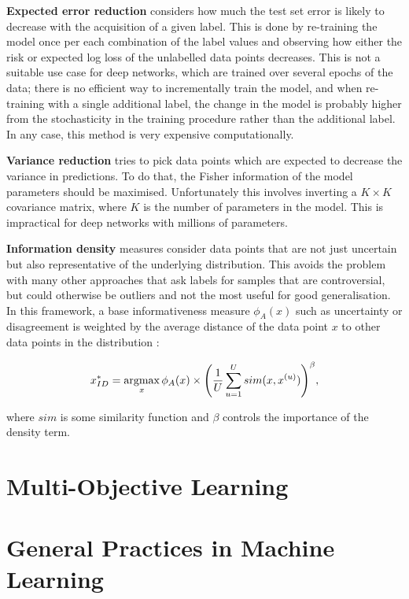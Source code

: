 \textbf{Expected error reduction} considers how much the test set error is likely to decrease with the acquisition of a given label.
This is done by re-training the model once per each combination of the label values and observing how either the risk or expected log loss of the unlabelled data points decreases.
This is not a suitable use case for deep networks, which are trained over several epochs of the data; there is no efficient way to incrementally train the model, and when re-training with a single additional label, the change in the model is probably higher from the stochasticity in the training procedure rather than the additional label.
In any case, this method is very expensive computationally.

\textbf{Variance reduction} tries to pick data points which are expected to decrease the variance in predictions.
To do that, the Fisher information of the model parameters should be maximised.
Unfortunately this involves inverting a $K \times K$ covariance matrix, where $K$ is the number of parameters in the model.
This is impractical for deep networks with millions of parameters.

\textbf{Information density} measures consider data points that are not just uncertain but also representative of the underlying distribution.
This avoids the problem with many other approaches that ask labels for samples that are controversial, but could otherwise be outliers and not the most useful for good generalisation.
In this framework, a base informativeness measure $\phi_A(x)$ such as uncertainty or disagreement is weighted by the average distance of the data point $x$ to other data points in the distribution \cite{inf_dens}:


\begin{equation}
 x^*_{ID} = \operatorname*{argmax}_x \phi_A(x) \times \Bigg( \frac{1}{U} \sum_{u=1}^U sim(x, x^{(u)}) \Bigg)^\beta,
\end{equation}

where $sim$ is some similarity function and $\beta$ controls the importance of the density term.

\section{Multi-Objective Learning}



\section{General Practices in Machine Learning}

